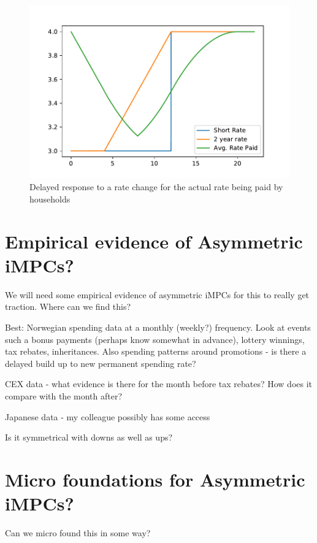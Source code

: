 \documentclass{article}
\begin{document}
\begin{figure} 
	\begin{centering}
		\includegraphics[scale=0.6]{../../Python/DoloCode/Figures/delayed_response.pdf}		
		\caption{Delayed response to a rate change for the actual rate being paid by households}
		\label{fig:delayed_response}
	\end{centering}
\end{figure}

\section{Empirical evidence of Asymmetric iMPCs?}

We will need some empirical evidence of asymmetric iMPCs for this to really get traction. Where can we find this?

Best: Norwegian spending data at a monthly (weekly?) frequency. Look at events such a bonus payments (perhaps know somewhat in advance), lottery winnings, tax rebates, inheritances. Also spending patterns around promotions - is there a delayed build up to new permanent spending rate?

CEX data - what evidence is there for the month before tax rebates? How does it compare with the month after?

Japanese data - my colleague possibly has some access

Is it symmetrical with downs as well as ups?


\section{Micro foundations for Asymmetric iMPCs?}
Can we micro found this in some way?
\end{document}
